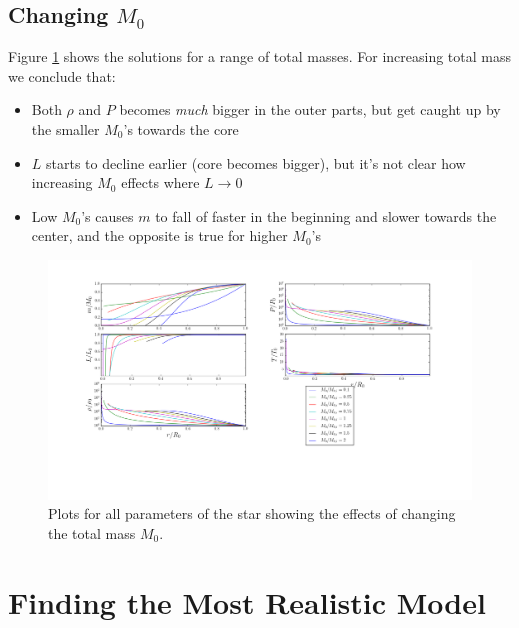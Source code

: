 \documentclass[11pt,twocolumn]{article}
\begin{document}
\subsection{Changing $M_0$}
Figure \ref{fig:M-variation} shows the solutions for a range of total
masses. For increasing total mass we conclude that:

\begin{itemize}
  \item Both $\rho$ and $P$ becomes \emph{much} bigger in the outer
    parts, but get caught up by the smaller $M_0$'s towards the core
  \item $L$ starts to decline earlier (core becomes bigger), but it's
    not clear how increasing $M_0$ effects where $L\rightarrow 0$
  \item Low $M_0$'s causes $m$ to fall of faster in the beginning and
    slower towards the center, and the opposite is true for higher $M_0$'s
\end{itemize}

\begin{figure}[ht]
  \centering
  \includegraphics[width=\linewidth]{fig/M_variation.png}
  \caption{\label{fig:M-variation} Plots for all parameters of the star
  showing the effects of changing the total mass $M_0$.}
\end{figure}


\section{Finding the Most Realistic Model}
\end{document}
